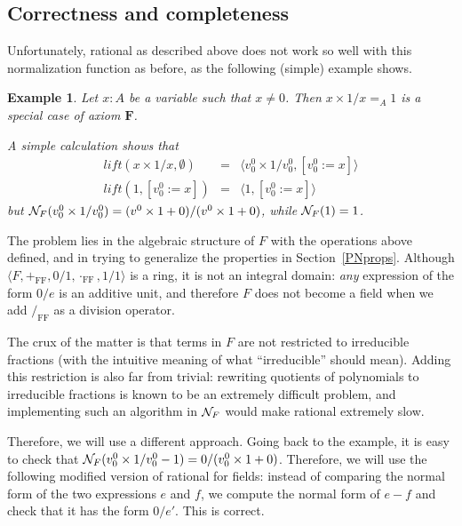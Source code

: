 \documentclass{article}
\newtheorem{example}[definition]{Example}
\newcommand{\NF}{\ensuremath{{\cal N}_{F}}}
\newcommand{\tacticname}[1]{\textsf{#1}}
\newcommand{\rational}{\tacticname{rational}}
\newcommand{\axiom}[1]{\ensuremath{\mathbf{#1}}}
\newcommand{\lift}{\ensuremath{\mathit{lift}}}
\newcommand{\plusFF}{\ensuremath{+_{\mathrm{FF}}}}
\newcommand{\multFF}{\ensuremath{\cdot_{\mathrm{FF}}}}
\newcommand{\divFF}{\ensuremath{/_{\mathrm{FF}}}}
\begin{document}
\subsection{Correctness and completeness}

Unfortunately, {\rational} as described above does not work so well
with this normalization function as before, as the following (simple)
example shows.

\begin{example} Let $x:A$ be a variable such that $x\neq 0$.
Then $x\times 1/x =_A1$ is a special case of axiom \axiom{F}.

A simple calculation shows that
\begin{eqnarray*}
\lift(x\times 1/x,\emptyset) & = &
  \langle v^0_0\times 1/v^0_0,[v^0_0:=x]\rangle \\
\lift(1,[v^0_0:=x]) & = &
  \langle 1,[v^0_0:=x]\rangle
\end{eqnarray*}
but $\NF(v^0_0\times 1/v^0_0)=(v^0\times 1+0)/(v^0\times 1+0)$, while
$\NF(1)=1$.
\end{example}

The problem lies in the algebraic structure of $F$ with the operations
above defined, and in trying to generalize the properties in
Section~\ref{PNprops}.
Although $\langle F,\plusFF,0/1,\multFF,1/1\rangle$ is a ring, it is not
an integral domain: \emph{any} expression of the form $0/e$ is an additive
unit, and therefore $F$ does not become a field when we add $\divFF$ as
a division operator.

The crux of the matter is that terms in $F$ are not restricted to
irreducible fractions (with the intuitive meaning of what ``irreducible''
should mean).
Adding this restriction is also far from trivial: rewriting quotients of
polynomials to irreducible fractions is known to be an extremely difficult
problem, and implementing such an algorithm in {\NF} would make {\rational}
extremely slow.

Therefore, we will use a different approach.
Going back to the example, it is easy to check that
$\NF(v^0_0\times 1/v^0_0-1)=0/(v^0_0\times 1+0)$.
Therefore, we will use the following modified version of {\rational}
for fields: instead of comparing the normal form of the two expressions
$e$ and $f$, we compute the normal form of $e-f$ and check that it has
the form $0/e'$.
This is correct.
\end{document}
